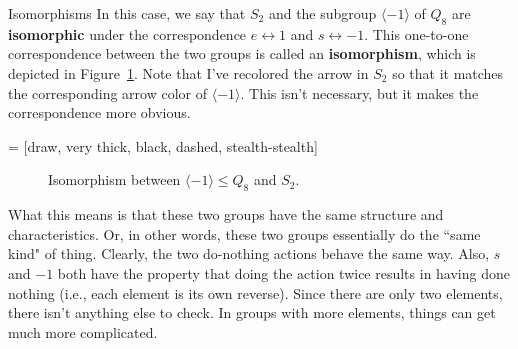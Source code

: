 \begin{section}{Isomorphisms}
In this case, we say that $S_2$ and the subgroup $\langle -1\rangle$ of $Q_8$ are \textbf{isomorphic} under the correspondence $e\leftrightarrow 1$ and $s\leftrightarrow -1$.  This one-to-one correspondence between the two groups is called an \textbf{isomorphism}, which is depicted in Figure~\ref{fig:isoS2}. Note that I've recolored the arrow in $S_2$ so that it matches the corresponding arrow color of $\langle -1\rangle$.  This isn't necessary, but it makes the correspondence more obvious.

 = [draw, very thick, black, dashed, stealth-stealth]

\begin{figure}[!ht]
\centering
{}
\caption{Isomorphism between $\langle -1\rangle\leq Q_8$ and $S_2$.}\label{fig:isoS2}
\end{figure}

What this means is that these two groups have the same structure and characteristics.  Or, in other words, these two groups essentially do the ``same kind" of thing.  Clearly, the two do-nothing actions behave the same way.  Also, $s$ and $-1$ both have the property that doing the action twice results in having done nothing (i.e., each element is its own reverse).  Since there are only two elements, there isn't anything else to check.  In groups with more elements, things can get much more complicated.  


\end{section}
